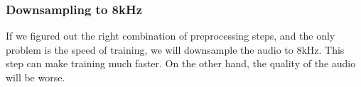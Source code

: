 \documentclass[12pt]{article}
\begin{document}
	\subsubsection{Downsampling to 8kHz}
	
	If we figured out the right combination of preprocessing steps, and the only problem is the speed of training, we will downsample the audio to 8kHz. This step can make training much faster. On the other hand, the quality of the audio will be worse.
	
	\newpage
	\printbibliography
	
	
\end{document}
